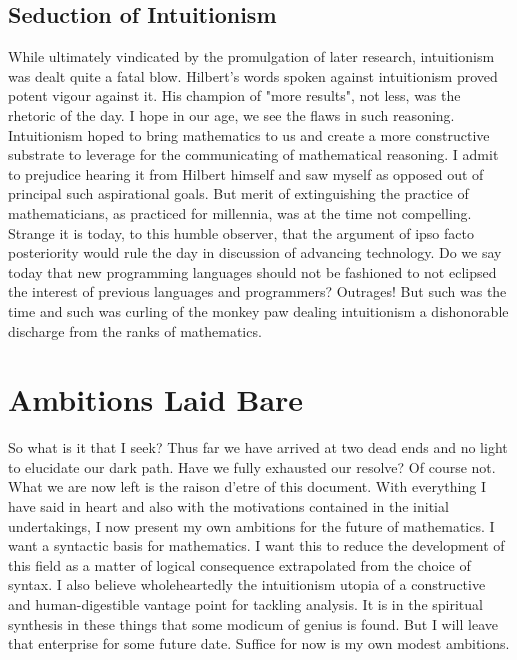 \documentclass[12pt]{article}
\begin{document}
\subsection{Seduction of Intuitionism}
While ultimately vindicated by the promulgation of later research, intuitionism
was dealt quite a fatal blow. Hilbert's words spoken against intuitionism
proved potent vigour against it. His champion of "more results", not less, was
the rhetoric of the day. I hope in our age, we see the flaws in such reasoning.
Intuitionism hoped to bring mathematics to us and create a more constructive
substrate to leverage for the communicating of mathematical reasoning. I admit
to prejudice hearing it from Hilbert himself and saw myself as opposed out of
principal such aspirational goals. But merit of extinguishing the practice of
mathematicians, as practiced for millennia, was at the time not compelling.
Strange it is today, to this humble observer, that the argument of ipso facto
posteriority would rule the day in discussion of advancing technology. Do we
say today that new programming languages should not be fashioned to not
eclipsed the interest of previous languages and programmers? Outrages! But such
was the time and such was curling of the monkey paw dealing intuitionism a
dishonorable discharge from the ranks of mathematics.

\section{Ambitions Laid Bare}
So what is it that I seek? Thus far we have arrived at two dead ends and no
light to elucidate our dark path. Have we fully exhausted our resolve? Of
course not. What we are now left is the raison d'etre of this document. With
everything I have said in heart and also with the motivations contained in the
initial undertakings, I now present my own ambitions for the future of
mathematics. I want a syntactic basis for mathematics. I want this to reduce
the development of this field as a matter of logical consequence extrapolated
from the choice of syntax. I also believe wholeheartedly the intuitionism
utopia of a constructive and human-digestible vantage point for tackling
analysis. It is in the spiritual synthesis in these things that some modicum of
genius is found. But I will leave that enterprise for some future date. Suffice
for now is my own modest ambitions.
\end{document}
